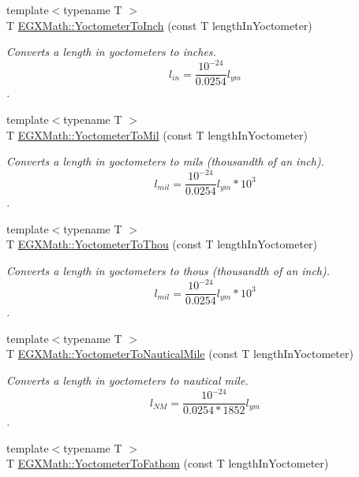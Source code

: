 \begin{DoxyCompactItemize}
{\footnotesize template$<$typename T $>$ }\\T \mbox{\hyperlink{group___e_g_x_math-_conversions-_length_conversions-_s_i-_yoctometer-_imperial_gaaaba7544cf3189cd374782786a13646c}{E\+G\+X\+Math\+::\+Yoctometer\+To\+Inch}} (const T length\+In\+Yoctometer)
\begin{DoxyCompactList}\small\item\em Converts a length in yoctometers to inches. \[ l_{in}= \frac{10^{-24}}{0.0254} l_{ym} \]. \end{DoxyCompactList}\item 
{\footnotesize template$<$typename T $>$ }\\T \mbox{\hyperlink{group___e_g_x_math-_conversions-_length_conversions-_s_i-_yoctometer-_imperial_gacb2a1154ec79cfd130de96e92dfeedfa}{E\+G\+X\+Math\+::\+Yoctometer\+To\+Mil}} (const T length\+In\+Yoctometer)
\begin{DoxyCompactList}\small\item\em Converts a length in yoctometers to mils (thousandth of an inch). \[ l_{mil}= \frac{10^{-24}}{0.0254} l_{ym} * 10^{3} \]. \end{DoxyCompactList}\item 
{\footnotesize template$<$typename T $>$ }\\T \mbox{\hyperlink{group___e_g_x_math-_conversions-_length_conversions-_s_i-_yoctometer-_imperial_ga9c2fbce1711afe0740edd868815ffea1}{E\+G\+X\+Math\+::\+Yoctometer\+To\+Thou}} (const T length\+In\+Yoctometer)
\begin{DoxyCompactList}\small\item\em Converts a length in yoctometers to thous (thousandth of an inch). \[ l_{mil}= \frac{10^{-24}}{0.0254} l_{ym} * 10^{3} \]. \end{DoxyCompactList}\item 
{\footnotesize template$<$typename T $>$ }\\T \mbox{\hyperlink{group___e_g_x_math-_conversions-_length_conversions-_s_i-_yoctometer-_nautical_gae49dab08f77667adbef6d419339a54c0}{E\+G\+X\+Math\+::\+Yoctometer\+To\+Nautical\+Mile}} (const T length\+In\+Yoctometer)
\begin{DoxyCompactList}\small\item\em Converts a length in yoctometers to nautical mile. \[ l_{NM}= \frac{10^{-24}}{0.0254 * 1852} l_{ym} \]. \end{DoxyCompactList}\item 
{\footnotesize template$<$typename T $>$ }\\T \mbox{\hyperlink{group___e_g_x_math-_conversions-_length_conversions-_s_i-_yoctometer-_nautical_gae0ed365ad4fa316377b2054b86012240}{E\+G\+X\+Math\+::\+Yoctometer\+To\+Fathom}} (const T length\+In\+Yoctometer)

\end{DoxyCompactItemize}
